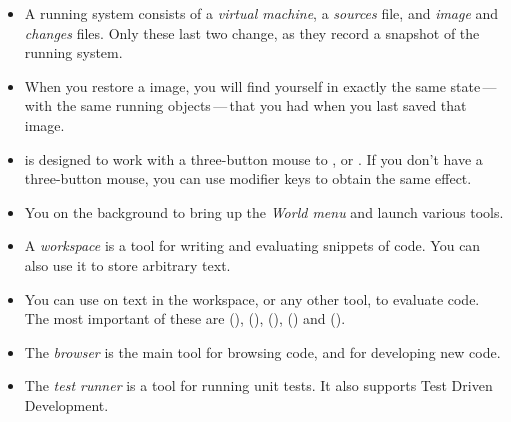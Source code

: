 \documentclass[a4paper,10pt,twoside]{book}
\begin{document}
\begin{itemize}
  \item A running \pharo system consists of a \emph{virtual machine}, a \emph{sources} file, and \emph{image} and \emph{changes} files. Only these last two change, as they record a snapshot of the running system.
  \item When you restore a \pharo image, you will find yourself in exactly the same state\,---\,with the same running objects\,---\,that you had when you last saved that image.
  \item \pharo is designed to work with a three-button mouse to \click, \actclick or \metaclick.  If you don't have a three-button mouse, you can use modifier keys to obtain the same effect.
  \item You \click on the \pharo background to bring up the \emph{World menu} and launch various tools.
  \item A \emph{workspace} is a tool for writing and evaluating snippets of code. You can also use it to store arbitrary text.
  \item You can use  on text in the workspace, or any other tool, to evaluate code. The most important of these are  (),  (),  (),  () and  ().
  \item The \emph{browser} is the main tool for browsing \pharo code, and for developing new code.
  \item The \emph{test runner} is a tool for running unit tests. It also supports Test Driven Development.
\end{itemize}

\ifx\wholebook\relax\else 
   
   
\end{document}
